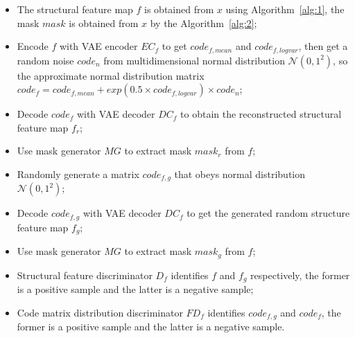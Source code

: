 \documentclass{ecai}
\begin{document}
\begin{itemize}
	\item The structural feature map $f$ is obtained from $x$ using Algorithm~\ref{alg:1}, the mask $mask$ is obtained from $x$ by the Algorithm~\ref{alg:2};
	\item Encode $f$ with VAE encoder $EC_f$ to get $code_{f,mean}$ and $code_{f,logvar}$, then get a random noise $code_n$ from multidimensional normal distribution $\mathcal{N}(0,1^2)$, so the approximate normal distribution matrix  $code_f=code_{f,mean}+exp(0.5\times code_{f,logvar})\times code_n$;
	\item Decode $code_f$ with VAE decoder $DC_f$ to obtain the reconstructed structural feature map $f_r$;
	\item Use mask generator $MG$ to extract mask $mask_r$ from $f$;
	\item Randomly generate a matrix $code_{f,g}$ that obeys normal distribution $\mathcal{N}(0,1^2)$;
	\item Decode $code_{f,g}$ with VAE decoder $DC_f$ to get the generated random structure feature map $f_g$;
	\item Use mask generator $MG$ to extract mask $mask_g$ from $f$;
	\item Structural feature discriminator $D_f$ identifies $f$ and $f_g$ respectively, the former is a positive sample and the latter is a negative sample;
	\item Code matrix distribution discriminator $FD_f$ identifies $code_{f,g}$ and $code_f$, the former is a positive sample and the latter is a negative sample.
\end{itemize}
\end{document}
